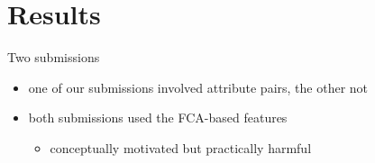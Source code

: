 \documentclass{beamer}
\newlength{\onecolwid}
\newcommand{\bull}[1]{
  \begin{itemize}
    \item #1
  \end{itemize}
}
\begin{document}
\begin{frame}[t]
\begin{columns}[t]
\begin{column}{\onecolwid}
  \section{Results} \label{sec:results}

  \begin{block}{Two submissions}
    \begin{itemize}
      \item one of our submissions involved attribute pairs, the other not
      \item both submissions used the FCA-based features
        \bull{conceptually motivated but practically harmful}
    \end{itemize}


  \end{block}
  \bigskip
  \begin{figure}
  \end{figure}





\end{column}
\end{columns}
\end{frame}
\end{document}
